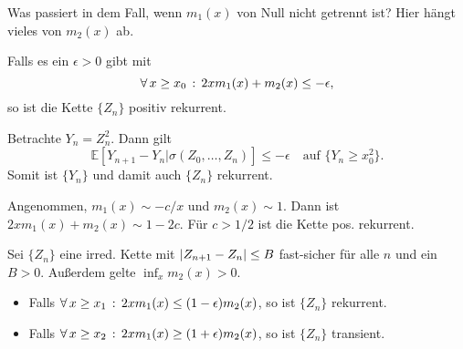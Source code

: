 \documentclass{cheat-sheet}
\newcommand{\E}{\mathbb{E}} %
\begin{document}
\begin{frage}
  Was passiert in dem Fall, wenn $m_1(x)$ von Null nicht getrennt ist? Hier hängt vieles von $m_2(x)$ ab.
\end{frage}

\begin{satz}
  Falls es ein $\epsilon > 0$ gibt mit
  \[
    \forall \, {x \geq x_0} \,:\, 2 x m_1(x) + m_2(x) \leq - \epsilon,
  \]
  so ist die Kette $\{ Z_n \}$ positiv rekurrent.
\end{satz}

\begin{beweisidee}
  Betrachte $Y_n = Z_n^2$.
  Dann gilt
  \[
    \E[ Y_{n+1} - Y_n | \sigma(Z_0, \ldots, Z_n) ] \leq - \epsilon
    \quad
    \text{auf } \{ Y_n \geq x_0^2 \}.
  \]
  Somit ist $\{ Y_n \}$ und damit auch $\{ Z_n \}$ rekurrent.
\end{beweisidee}

\begin{bsp}
  Angenommen, $m_1(x) \sim - c / x$ und $m_2(x) \sim 1$.
  Dann ist $2 x m_1(x) + m_2(x) \sim 1 - 2 c$.
  Für $c > 1/2$ ist die Kette pos. rekurrent.
\end{bsp}

\begin{satz}
  Sei $\{ Z_n \}$ eine irred. Kette mit
  $\lvert Z_{n+1} - Z_n\rvert \leq B$ fast-sicher für alle $n$ und ein $B > 0$.
  Außerdem gelte ${\inf}_{x} m_2(x) > 0$.
  \begin{itemize}
    \item Falls $\forall \, {x \geq x_1} \,:\, 2 x m_1(x) \leq (1-\epsilon) m_2(x)$, so ist $\{ Z_n \}$ rekurrent.
    \item Falls $\forall \, {x \geq x_2} \,:\, 2 x m_1(x) \geq (1 + \epsilon) m_2(x)$, so ist $\{ Z_n \}$ transient.
  \end{itemize}
\end{satz}
\end{document}
